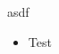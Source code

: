 \documentclass{article}
\begin{document}
asdf
\begin{itemize}
BBB  \item Test
\end{itemize}
\end{document}
